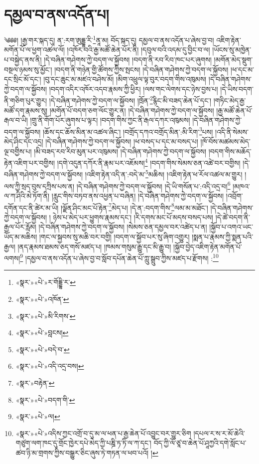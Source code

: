 \chapter{དམྱལ་བ་ནས་འདོན་པ།}༄༅༅། །རྒྱ་གར་སྐད་དུ། ན་:རག་ཨུདྡྷ་རི་\footnote{«སྣར་»«པེ་»ར་གོདྡྷི་ར་}ནཱ་མ། བོད་སྐད་དུ། དམྱལ་བ་ནས་འདོན་པ་ཞེས་བྱ་བ། འཇིག་རྟེན་མགོན་པོ་ལ་ཕྱག་འཚལ་ལོ། །འཁོར་བའི་རྒྱ་མཚོ་ཆེན་པོར་ནི། །དབུལ་བའི་འདམ་དུ་བྱིང་བ་ལ། །ཡོངས་སུ་མཁྱེན་པ་བསྐྱེད་ནས་ནི། །དེ་བཞིན་གཤེགས་ཀྱེ་བདག་ལ་སྐྱོབས། །བདག་ནི་རབ་རིབ་ཁང་པར་ཞུགས། །མགོན་མེད་སྡུག་བསྔལ་ཉམས་སུ་མྱོང་། །བདག་ནི་གཉེན་གྱི་ཚོགས་ཀྱིས་སྤངས། །དེ་བཞིན་གཤེགས་ཀྱེ་བདག་ལ་སྐྱོབས། །ཕ་དང་མ་དང་སྲིང་མོ་དང་། །བུ་དང་ཆུང་མ་མཛའ་བཤེས་མོ། །མིག་འཕྲུལ་ལྟ་བུར་བདག་གིས་འཁུམས། །དེ་བཞིན་གཤེགས་ཀྱེ་བདག་ལ་སྐྱོབས། །བདག་འདིར་འཁོར་འདབ་རྣམས་ཀྱི་ཕྱིར། །ལས་གང་ལེགས་དང་ཉེས་བྱས་པ། །དེ་ཡིས་བདག་ནི་གཅིག་པུར་གྱུར། །དེ་བཞིན་གཤེགས་ཀྱེ་བདག་ལ་སྐྱོབས། །ཁྲོན་\footnote{«སྣར་»«པེ་»འཁོན་}རྙིང་མི་བཟད་ཆེན་པོ་དང་། །གཏིང་མེད་རྒྱ་མཚོ་དག་རྣམས་སུ། །མགོན་པོ་བདག་ཅག་ལོང་གྱུར་ན། །དེ་བཞིན་གཤེགས་ཀྱེ་བདག་ལ་སྐྱོབས། །རྒྱ་མཚོ་ཆེན་པོ་རྒལ་བ་ཡི། །གྲུ་ནི་གོག་པོར་ཞུགས་པ་ལྟར། །བདག་གིས་ཀྱང་ནི་རྒལ་དཀར་འཁུམས། །དེ་བཞིན་གཤེགས་ཀྱེ་བདག་ལ་སྐྱོབས། །ཆོས་དང་ཆོས་མིན་མ་འཚལ་ཞིང་། །བགྲོད་དཀའ་བགྲོད་མིན་:མི་རིག་\footnote{«སྣར་»«པེ་»མི་རིགས་}པས། །འདི་ནི་སེམས་མེད་ཤིང་དང་འདྲ། །དེ་བཞིན་གཤེགས་ཀྱེ་བདག་ལ་སྐྱོབས། །ཕ་བསད་པ་དང་མ་བསད་པ། །ཁོ་བོས་མཚམས་མེད་ལྔ་བགྱིས་པ། །མི་བཟད་རབ་རིབ་མུན་པར་འཁུམས། །དེ་བཞིན་གཤེགས་ཀྱེ་བདག་ལ་སྐྱོབས། །བདག་གིས་མཆོད་རྟེན་འཇིག་པར་བགྱིས། །དགེ་འདུན་དཀོར་ནི་རྣམ་པར་འཇོམས།\footnote{«སྣར་»«པེ་»བླངས།} །བདག་གིས་སེམས་ཅན་འཚེ་བར་བགྱིས། །དེ་བཞིན་གཤེགས་ཀྱེ་བདག་ལ་སྐྱོབས། །འཇིག་རྟེན་འདི་ན་:བདེ་མ་\footnote{«སྣར་»«པེ་»བདེ་བ་}མཆིས། །འཇིག་རྟེན་ཕ་རོལ་འཚལ་མ་གྱུར། །ལས་ཀྱི་སྲད་བུས་དཀྲིས་པས་ན། །དེ་བཞིན་གཤེགས་ཀྱེ་བདག་ལ་སྐྱོབས། །དེ་ཡི་གསོན་པ་:འདི་འདྲ་བ།\footnote{«སྣར་»«པེ་»འདི་འདྲ་བས།} །མཁའ་ལ་ཀ་ཤིའི་མེ་ཏོག་ནི། །རླུང་གིས་བཏབ་ནས་འཕྱན་པ་བཞིན། །དེ་བཞིན་གཤེགས་ཀྱེ་བདག་ལ་སྐྱོབས། །འབྲོག་དགོན་དང་ནི་ཚེར་མ་ཡི། །ལྗོན་ཤིང་མང་པོ་རྟེན་\footnote{«སྣར་»བརྟེན་}མེད་པ། །དེ་ན་:བདག་གིས་\footnote{«སྣར་»«པེ་»བདག་གི་}ལམ་མ་མཐོང་། །དེ་བཞིན་གཤེགས་ཀྱེ་བདག་ལ་སྐྱོབས། །
ཉེས་པ་མེད་པར་ཕྱུགས་རྣམས་དང་། །རི་དགས་མང་པོ་མདས་བསད་པས། །དེ་ཚེ་བདག་ནི་རྒྱལ་པོར་རློམ། །དེ་བཞིན་གཤེགས་ཀྱེ་བདག་ལ་སྐྱོབས། །སེམས་ཅན་དམྱལ་བར་འཚེད་པ་ན། །སྐྱོབ་པ་འགའ་ཡང་ཡོད་མ་མཆིས། །གང་ལ་སྐྱབས་སུ་མཆི་བར་བགྱི། །བདག་ལ་སྐྱོབ་པར་སུ་ཞིག་འགྱུར། །སྨན་པ་རྣམས་ཀྱི་སྨན་པའི་རྒྱལ། །ནད་རྣམས་ཐམས་ཅད་གསོ་མཛད་པ། །ཁམས་གསུམ་རྒྱུ་དང་མི་རྒྱུ་བ། །སྐྱོབ་བྱེད་འཇིག་རྟེན་མགོན་པོ་ལགས།\footnote{«སྣར་»«པེ་»ལ།} །དམྱལ་བ་ནས་འདོན་པ་ཞེས་བྱ་བ་སློབ་དཔོན་ཆེན་པོ་ཀླུ་སྒྲུབ་ཀྱིས་མཛད་པ་རྫོགས། :\footnote{«སྣར་»«པེ་»འདིས་ཀྱང་འགྲོ་བ་དུ་མ་ལ་ཕན་པ་རྒྱ་ཆེན་པོ་འབྱུང་བར་གྱུར་ཅིག །དཔལ་ར་ས་ར་མོ་ཆེའི་གཙུག་ལག་ཁང་དུ་གྲོང་ཁྱེར་དཔེ་མེད་ཀྱི་པཎྜི་ཏ་ཏི་ལ་ཀ་དང་། བོད་ཀྱི་ལོ་ཙཱ་བ་ཆེན་པོ་ཤཱཀྱའི་དགེ་སློང་པ་ཚབ་ཉི་མ་གྲགས་ཀྱིས་བསྒྱུར་ཅིང་ཞུས་ཏེ་གཏན་ལ་ཕབ་པའོ། །}